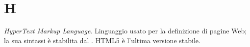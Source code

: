 \section{H}

\textit{HyperText Markup Language}. Linguaggio usato per la definizione di pagine Web; la sua sintassi è stabilita dal .
HTML5 è l'ultima versione stabile.

